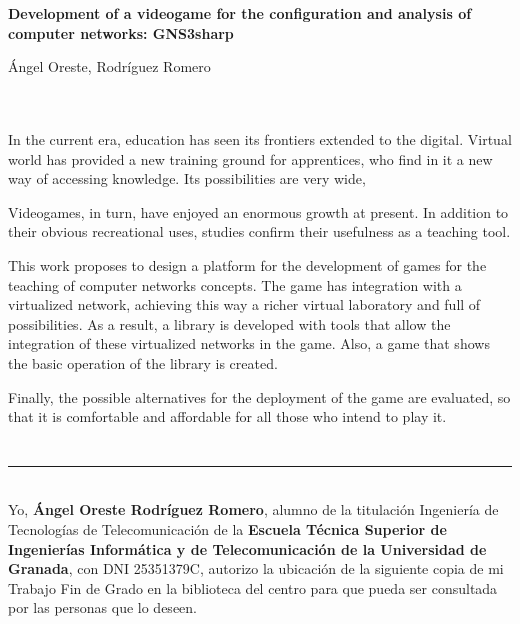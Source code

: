 \cleardoublepage


\thispagestyle{empty}


\begin{center}
{\large\bfseries Development of a videogame for the configuration and analysis of computer networks: GNS3sharp}\\
\end{center}
\begin{center}
Ángel Oreste, Rodríguez Romero\\
\end{center}

\\

\vspace{0.7cm}
\\

In the current era, education has seen its frontiers extended to the digital. Virtual world has provided a new training ground for apprentices, who find in it a new way of accessing knowledge. Its possibilities are very wide,

Videogames, in turn, have enjoyed an enormous growth at present. In addition to their obvious recreational uses, studies confirm their usefulness as a teaching tool.

This work proposes to design a platform for the development of games for the teaching of computer networks concepts. The game has integration with a virtualized network, achieving this way a richer virtual laboratory and full of possibilities. As a result, a library is developed with tools that allow the integration of these virtualized networks in the game. Also, a game that shows the basic operation of the library is created.

Finally, the possible alternatives for the deployment of the game are evaluated, so that it is comfortable and affordable for all those who intend to play it.

\chapter*{}
\thispagestyle{empty}

\noindent\rule[-1ex]{\textwidth}{2pt}\\[4.5ex]

Yo, \textbf{Ángel Oreste Rodríguez Romero}, alumno de la titulación Ingeniería de Tecnologías de Telecomunicación de la \textbf{Escuela Técnica Superior
de Ingenierías Informática y de Telecomunicación de la Universidad de Granada}, con DNI 25351379C, autorizo la
ubicación de la siguiente copia de mi Trabajo Fin de Grado en la biblioteca del centro para que pueda ser
consultada por las personas que lo deseen.

